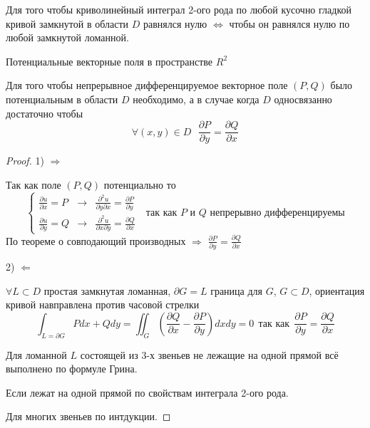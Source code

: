 \begin{block}[Следствие]
  Для того чтобы криволинейный интеграл 2-ого рода по любой кусочно гладкой
  кривой замкнутой в области $D$ равнялся нулю $\Leftrightarrow$ чтобы он
  равнялся нулю по любой замкнутой ломанной.
\end{block}

\begin{title}[\Large]
  Потенциальные векторные поля в пространстве $R^2$
\end{title}

\begin{block}
  Для того чтобы непрерывное дифференцируемое векторное поле $(P, Q)$
  было потенциальным в области $D$ необходимо, а в случае когда
  $D$ односвязанно достаточно чтобы
  $$
  \forall (x,y) \in D  ~~~ \frac{\partial P}{\partial y} =
  \frac{\partial Q}{\partial x}
  $$
\end{block}

\begin{proof}
  1) $\Rightarrow$

  Так как поле $(P,Q)$ потенциально то
  $$
  \left\{
  \begin{array}{lcl}
    \frac{\partial u}{\partial x} = P & \to &
    \frac{\partial^2 u}{\partial y \partial x} =
    \frac{\partial P}{\partial y} \\
    \frac{\partial u}{\partial y} = Q & \to &
    \frac{\partial^2 u}{\partial x \partial y} =
    \frac{\partial Q}{\partial x}
  \end{array}
  \right. ~~~ \text{так как $P$ и $Q$ непрерывно дифференцируемы}
  $$
  По теореме о совподающий производных $\Rightarrow$
  $\frac{\partial P}{\partial y} = \frac{\partial Q}{\partial x}$

  2) $\Leftarrow$

  $\forall L \subset D$ простая замкнутая ломанная, $\partial G = L$ граница
  для $G$, $G \subset D$, ориентация кривой навправлена против часовой стрелки
  $$
  \int_{L = \partial G} Pdx + Qdy =
  \iint_G \left( \frac{\partial Q}{\partial x} -
  \frac{\partial P}{\partial y} \right) dx dy = 0
  ~~ \text{так как} ~~
  \frac{\partial P}{\partial y} = \frac{\partial Q}{\partial x}
  $$

  Для ломанной $L$ состоящей из 3-х звеньев не лежащие на одной прямой всё
  выполнено по формуле Грина.

  Если лежат на одной прямой по свойствам интеграла 2-ого рода.

  Для многих звеньев по интдукции.
\end{proof}
